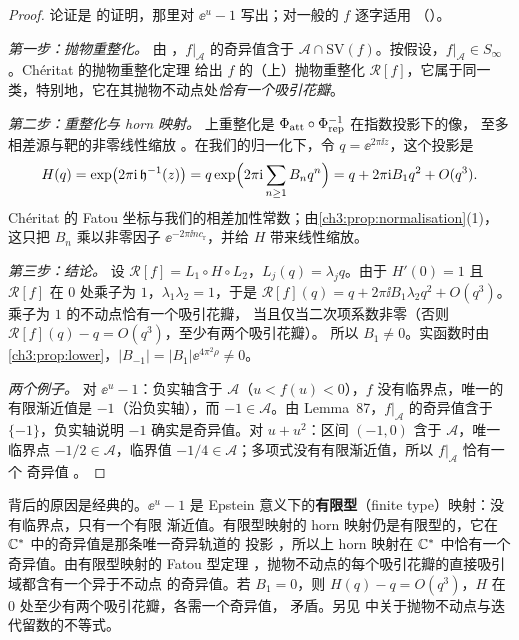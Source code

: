 \begin{proof}
论证是 \cite[Prop.~2.4]{KneserPaper} 的证明，那里对 $\ee^u-1$ 写出；对一般的 $f$ 逐字适用
（\cite[\S9, Remark~9.5]{KneserPaper}）。

\emph{第一步：抛物重整化。} 由 \cite[Lemma~87]{Cheritat2022}，$f|_{\mathcal A}$ 的奇异值含于
$\mathcal A\cap\mathrm{SV}(f)$。按假设，$f|_{\mathcal A}\in S_\infty$。Chéritat 的抛物重整化定理
\cite[Theorem~9, Corollary~11]{Cheritat2022} 给出 $f$ 的（上）抛物重整化 $\mathcal R[f]$，它属于同一
类，特别地，它在其抛物不动点处\emph{恰有一个吸引花瓣}。

\emph{第二步：重整化与 horn 映射。} 上重整化是 $\Phi_{\mathrm{att}}\circ\Phi_{\mathrm{rep}}^{-1}$ 在指数投影下的像，
至多相差源与靶的非零线性缩放 \cite[Appendix~A]{Cheritat2022}。在我们的归一化下，令
$q=\ee^{2\pi\ii z}$，这个投影是
\[
 H(q)=\exp\bigl(2\pi\mathrm{i}\,\mathfrak h^{-1}(z)\bigr)=q\exp\Bigl(2\pi\mathrm{i}\sum_{n\ge1}B_nq^n\Bigr)
 =q+2\pi\mathrm{i} B_1q^2+O(q^3).
\]
Chéritat 的 Fatou 坐标与我们的相差加性常数；由\cref{ch3:prop:normalisation}(1)，这只把 $B_n$
乘以非零因子 $\ee^{-2\pi\ii nc_{\mathrm r}}$，并给 $H$ 带来线性缩放。

\emph{第三步：结论。} 设 $\mathcal R[f]=L_1\circ H\circ L_2$，$L_j(q)=\lambda_jq$。由于 $H'(0)=1$ 且
$\mathcal R[f]$ 在 $0$ 处乘子为 $1$，$\lambda_1\lambda_2=1$，于是
$\mathcal R[f](q)=q+2\pi\ii B_1\lambda_2q^2+O(q^3)$。乘子为 $1$ 的不动点恰有一个吸引花瓣，
当且仅当二次项系数非零（否则 $\mathcal R[f](q)-q=O(q^3)$，至少有两个吸引花瓣）。
所以 $B_1\ne0$。实函数时由\cref{ch3:prop:lower}，$|B_{-1}|=|B_1|\ee^{4\pi^2\rho}\ne0$。

\emph{两个例子。} 对 $\ee^u-1$：负实轴含于 $\mathcal A$（$u<f(u)<0$），$f$ 没有临界点，唯一的
有限渐近值是 $-1$（沿负实轴），而 $-1\in\mathcal A$。由 Lemma~87，$f|_{\mathcal A}$ 的奇异值含于
$\{-1\}$，负实轴说明 $-1$ 确实是奇异值。对 $u+u^2$：区间 $(-1,0)$ 含于 $\mathcal A$，唯一临界点
$-1/2\in\mathcal A$，临界值 $-1/4\in\mathcal A$；多项式没有有限渐近值，所以 $f|_{\mathcal A}$ 恰有一个
奇异值 \cite[\S9, Remark~9.5]{KneserPaper}。
\end{proof}

\begin{remark}[机制]\label{ch3:rem:mechanism}
背后的原因是经典的。$\ee^u-1$ 是 Epstein 意义下的\textbf{有限型}（finite type）映射：没有临界点，只有一个有限
渐近值。有限型映射的 horn 映射仍是有限型的，它在 $\mathbb{C}^*$ 中的奇异值是那条唯一奇异轨道的
投影 \cite{Epstein1993}，所以上 horn 映射在 $\mathbb{C}^*$ 中恰有一个奇异值。由有限型映射的
Fatou 型定理 \cite{Epstein1993}，抛物不动点的每个吸引花瓣的直接吸引域都含有一个异于不动点
的奇异值。若 $B_1=0$，则 $H(q)-q=O(q^3)$，$H$ 在 $0$ 处至少有两个吸引花瓣，各需一个奇异值，
矛盾。另见 \cite{BuffEpstein2002} 中关于抛物不动点与迭代留数的不等式。
\end{remark}

